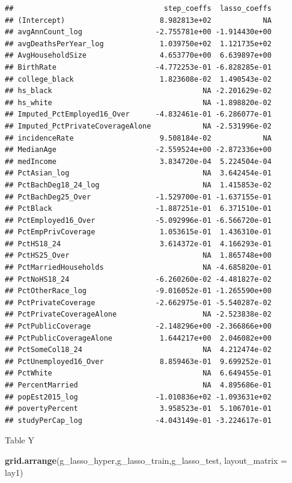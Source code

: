 \documentclass[
  11pt,
]{article}
\newenvironment{Shaded}{\begin{snugshade}}{\end{snugshade}}
\newcommand{\DataTypeTok}[1]{\textcolor[rgb]{0.13,0.29,0.53}{#1}}
\newcommand{\KeywordTok}[1]{\textcolor[rgb]{0.13,0.29,0.53}{\textbf{#1}}}
\newcommand{\NormalTok}[1]{#1}
\begin{document}
\begin{verbatim}
##                                   step_coeffs  lasso_coeffs
## (Intercept)                      8.982813e+02            NA
## avgAnnCount_log                 -2.755781e+00 -1.914430e+00
## avgDeathsPerYear_log             1.039750e+02  1.121735e+02
## AvgHouseholdSize                 4.653770e+00  6.639897e+00
## BirthRate                       -4.772253e-01 -6.828285e-01
## college_black                    1.823608e-02  1.490543e-02
## hs_black                                   NA -2.201629e-02
## hs_white                                   NA -1.898820e-02
## Imputed_PctEmployed16_Over      -4.832461e-01 -6.286077e-01
## Imputed_PctPrivateCoverageAlone            NA -2.531996e-02
## incidenceRate                    9.508184e-02            NA
## MedianAge                       -2.559524e+00 -2.872336e+00
## medIncome                        3.834720e-04  5.224504e-04
## PctAsian_log                               NA  3.642454e-01
## PctBachDeg18_24_log                        NA  1.415853e-02
## PctBachDeg25_Over               -1.529700e-01 -1.637155e-01
## PctBlack                        -1.887251e-01  6.371510e-01
## PctEmployed16_Over              -5.092996e-01 -6.566720e-01
## PctEmpPrivCoverage               1.053615e-01  1.436310e-01
## PctHS18_24                       3.614372e-01  4.166293e-01
## PctHS25_Over                               NA  1.865748e+00
## PctMarriedHouseholds                       NA -4.685820e-01
## PctNoHS18_24                    -6.260260e-02 -4.481827e-02
## PctOtherRace_log                -9.016052e-01 -1.265590e+00
## PctPrivateCoverage              -2.662975e-01 -5.540287e-02
## PctPrivateCoverageAlone                    NA -2.523838e-02
## PctPublicCoverage               -2.148296e+00 -2.366866e+00
## PctPublicCoverageAlone           1.644217e+00  2.046082e+00
## PctSomeCol18_24                            NA  4.212474e-02
## PctUnemployed16_Over             8.859463e-01  9.699252e-01
## PctWhite                                   NA  6.649455e-01
## PercentMarried                             NA  4.895686e-01
## popEst2015_log                  -1.010836e+02 -1.093631e+02
## povertyPercent                   3.958523e-01  5.106701e-01
## studyPerCap_log                 -4.043149e-01 -3.224617e-01
\end{verbatim}

Table Y

\begin{Shaded}
\begin{Highlighting}[]
\KeywordTok{grid.arrange}\NormalTok{(g_lasso_hyper,g_lasso_train,g_lasso_test, }\DataTypeTok{layout_matrix =}\NormalTok{ lay1)}
\end{Highlighting}
\end{Shaded}
\end{document}
